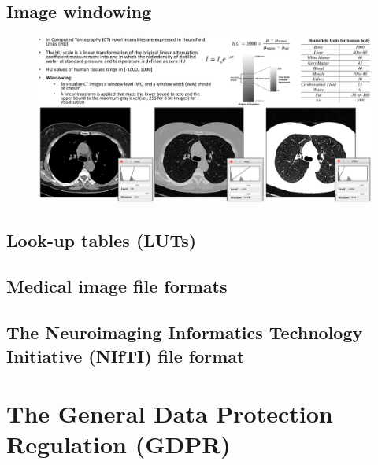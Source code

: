 \subsection{Image windowing}

\begin{figure}[ht]
	\centering
	\includegraphics[width=0.9\linewidth]{figure_med/img_windowing}
\end{figure}
\FloatBarrier

\subsection{Look-up tables (LUTs)}

\subsection{Medical image file formats}



\subsection{The Neuroimaging Informatics Technology Initiative (NIfTI) file format}

\section{The General Data Protection Regulation (GDPR)}
